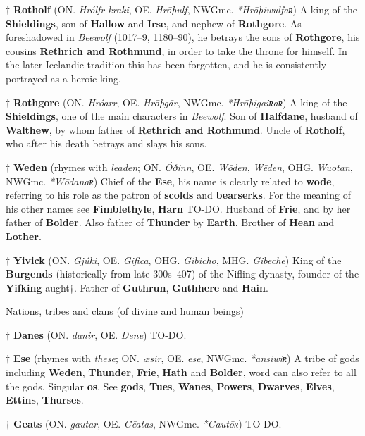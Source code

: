 † \textbf{Rotholf} (ON. \emph{Hrólfr kraki}, OE. \emph{Hrōþulf}, NWGmc. \emph{*Hrōþiwulfaʀ})
 A king of the \textbf{Shieldings}, son of \textbf{Hallow} and \textbf{Irse}, and nephew of \textbf{Rothgore}. As foreshadowed in \emph{Beewolf} (1017–9, 1180–90), he betrays the sons of \textbf{Rothgore}, his cousins \textbf{Rethrich and Rothmund}, in order to take the throne for himself. In the later Icelandic tradition this has been forgotten, and he is consistently portrayed as a heroic king.
 
† \textbf{Rothgore} (ON. \emph{Hróarr}, OE. \emph{Hrōþgār}, NWGmc. \emph{*Hrōþigaiʀaʀ})
 A king of the \textbf{Shieldings}, one of the main characters in \emph{Beewolf}. Son of \textbf{Halfdane}, husband of \textbf{Walthew}, by whom father of \textbf{Rethrich and Rothmund}. Uncle of \textbf{Rotholf}, who after his death betrays and slays his sons.
 
† \textbf{Weden} (rhymes with \emph{leaden}; ON. \emph{Óðinn}, OE. \emph{Wōden}, \emph{Wēden}, OHG. \emph{Wuotan}, NWGmc. \emph{*Wōdanaʀ})
 Chief of the \textbf{Ese}, his name is clearly related to \textbf{wode}, referring to his role as the patron of \textbf{scolds} and \textbf{bearserks}. For the meaning of his other names see \textbf{Fimblethyle}, \textbf{Harn} TO-DO. Husband of \textbf{Frie}, and by her father of \textbf{Bolder}. Also father of \textbf{Thunder} by \textbf{Earth}. Brother of \textbf{Hean} and \textbf{Lother}.

† \textbf{Yivick} (ON. \emph{Gjúki}, OE. \emph{Gifica}, OHG. \emph{Gibicho}, MHG. \emph{Gibeche})
 King of the \textbf{Burgends} (historically from late 300s–407) of the Nifling dynasty, founder of the \textbf{Yifking} aught†. Father of \textbf{Guthrun}, \textbf{Guthhere} and \textbf{Hain}.



Nations, tribes and clans (of divine and human beings)

† \textbf{Danes} (ON. \emph{danir}, OE. \emph{Dene})
 TO-DO.

† \textbf{Ese} (rhymes with \emph{these}; ON. \emph{æsir}, OE. \emph{ēse}, NWGmc. \emph{*ansiwiʀ})
 A tribe of gods including \textbf{Weden}, \textbf{Thunder}, \textbf{Frie}, \textbf{Hath} and \textbf{Bolder}, word can also refer to all the gods. Singular \textbf{os}. See \textbf{gods}, \textbf{Tues}, \textbf{Wanes}, \textbf{Powers}, \textbf{Dwarves}, \textbf{Elves}, \textbf{Ettins}, \textbf{Thurses}.
 
† \textbf{Geats} (ON. \emph{gautar}, OE. \emph{Gēatas}, NWGmc. \emph{*Gautōʀ})
 TO-DO.

